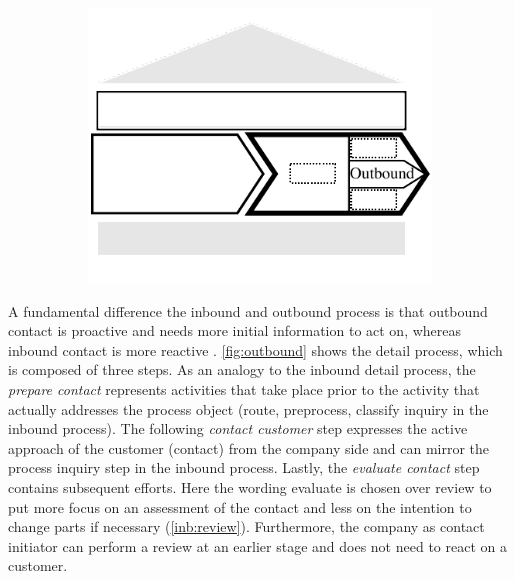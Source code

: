 				\begin{figure}[caption={Outbound process}, label={fig:outbound}]
			\begin{subfigure}[b]{.45\textwidth}
				\begin{center}
					\includegraphics{figures/outbound.pdf}
				\end{center}
			\end{subfigure}
			\begin{subfigure}[b]{.45\textwidth}
				\begin{center}
				\end{center}
			\end{subfigure}
			
		\end{figure}
		
		
		
		
		A fundamental difference the inbound and outbound process is that outbound contact is proactive and needs more initial information to act on, whereas inbound contact is more reactive \citep{DimensionData2015}. \Fig \ref{fig:outbound} shows the detail process, which is composed of three steps. As an analogy to the inbound detail process, the \textit{prepare contact} represents activities that take place prior to the activity that actually addresses the process object (route, preprocess, classify inquiry in the inbound process). The following \textit{contact customer} step expresses the active approach of the customer (contact) from the company side and can mirror the process inquiry step in the inbound process. Lastly, the \textit{evaluate contact} step contains subsequent efforts. Here the wording evaluate is chosen over review to put more focus on an assessment of the contact and less on the intention to change parts if necessary (\cf \ref{inb:review}). Furthermore, the company as contact initiator can perform a review at an earlier stage and does not need to react on a customer. 
		

